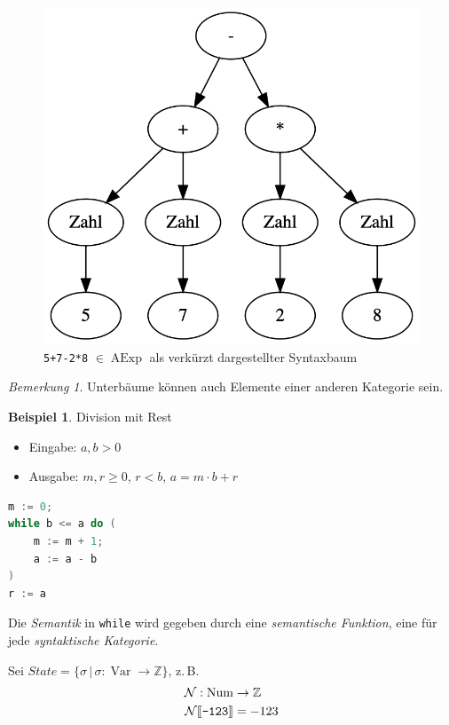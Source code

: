 \documentclass[a4paper,12pt]{article}
\theoremstyle{definition}
\newtheorem*{example}{Beispiel}
\theoremstyle{plain}
\theoremstyle{remark}
\newtheorem*{remark}{Bemerkung}
\newcommand{\lsem}{\mathrm{[}\kern-.14em\mathrm{[}}
\newcommand{\rsem}{\mathrm{]}\kern-.14em\mathrm{]}}
\newcommand{\zb}{z.\,B.\;}
\DeclareMathOperator{\AExp}{AExp}
\DeclareMathOperator{\Num}{Num}
\DeclareMathOperator{\Var}{Var}
\begin{document}
\begin{figure}[H]
    \centering
    \includegraphics[width=.4\textwidth]{syntaxbaum.png}
    \caption{\texttt{5+7-2*8} $\in \AExp$ als verkürzt dargestellter Syntaxbaum}
    \label{fig:syntaxbaum}
\end{figure}

\begin{remark}
    Unterbäume können auch Elemente einer anderen Kategorie sein.
\end{remark}

\begin{example}
    Division mit Rest
    \begin{itemize}
        \item Eingabe: $a, b > 0$
        \item Ausgabe: $m ,r \geq 0$, $r < b$, $a = m \cdot b + r$
    \end{itemize}
\end{example}

\begin{lstlisting}[language=C, caption=Division mit Rest]
m := 0;
while b <= a do (
    m := m + 1;
    a := a - b
)
r := a
\end{lstlisting}

Die \emph{Semantik} in \texttt{while} wird gegeben durch eine \emph{semantische Funktion}, eine für jede \emph{syntaktische Kategorie}.

Sei $State = \{ \sigma \,\vert\, \sigma: \Var \to \mathbb{Z} \}$, \zb
\begin{align*}
    \mathcal{N} : \Num & \to \mathbb{Z} \\
    \mathcal{N}\lsem\texttt{-123}\rsem & = -123
\end{align*}
\end{document}

